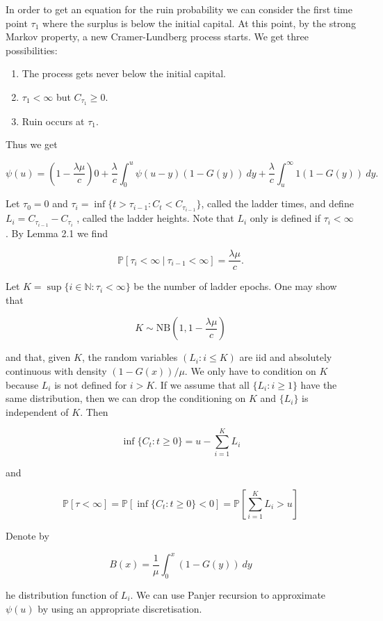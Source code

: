 \documentclass[a4paper,10pt,openany]{book}
\providecommand{\tightlist}{%
 \setlength{\itemsep}{0pt}\setlength{\parskip}{0pt}}
\begin{document}
In order to get an equation for the ruin probability we can consider the first time point \(\tau_1\) where the surplus is below the initial capital. At this point, by the strong Markov property, a new Cramer-Lundberg process starts. We get three possibilities:

\begin{enumerate}
\def\labelenumi{\roman{enumi})}
\tightlist
\item
  The process gets never below the initial capital.
\item
  \(\tau_1 <\infty\) but \(C_{\tau_1}\ge 0\).
\item
  Ruin occurs at \(\tau_1\).
\end{enumerate}

Thus we get

\[
\psi(u)=\left(1-\frac{\lambda \mu}{c}\right)0+\frac{\lambda}{c}\int_0^u\psi(u-y)(1-G(y))\ dy+\frac{\lambda}{c}\int_u^\infty 1(1-G(y))\ dy.
\]

Let \(\tau_0 = 0\) and \(\tau_i = \inf\{t > \tau_{i−1} : C_t < C_{\tau_{i-1}}\}\), called the ladder times, and define \(L_i = C_{\tau_{i−1}} − C_{\tau_i}\) , called the ladder heights. Note that \(L_i\) only is defined if \(\tau_i <\infty\). By Lemma 2.1 we find

\[
\mathbb P[\tau_i<\infty\ \vert\ \tau_{i-1}<\infty]=\frac{\lambda \mu}{c}.
\]

Let \(K = \sup\{i \in\mathbb N : \tau_i < \infty\}\) be the number of ladder epochs. One may show that

\[
K \sim \text{NB}\left(1, 1 − \frac{\lambda \mu}{c}\right)
\]

and that, given \(K\), the random variables \((L_i : i \le K)\) are iid and absolutely continuous with density \((1 − G(x))/\mu\). We only have to condition on \(K\) because \(L_i\) is not defined for \(i > K\). If we assume that all \(\{L_i : i \ge 1\}\) have the same distribution, then we can drop the conditioning on \(K\) and \(\{L_i\}\) is independent of \(K\). Then

\[
\inf\{C_t : t\ge 0\}=u-\sum_{i=1}^K L_i
\]

and

\[
\mathbb P[\tau <\infty]=\mathbb P[\inf\{C_t : t\ge 0\}<0]=\mathbb P\left[\sum_{i=1}^K L_i> u\right]
\]

Denote by

\[
B(x)=\frac{1}{\mu}\int_0^x(1-G(y))\ dy
\]

he distribution function of \(L_i\). We can use Panjer recursion to approximate \(\psi(u)\) by using an appropriate discretisation.
\end{document}
